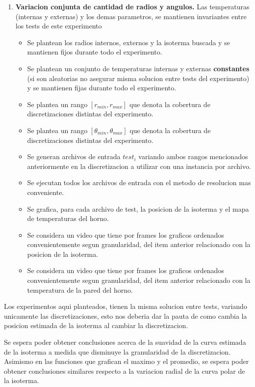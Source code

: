 \begin{enumerate}
    \item \textbf{Variacion conjunta de cantidad de radios y angulos.} Las temperaturas (internas y externas) y los demas parametros, se mantienen invariantes entre los tests de este experimento\begin{itemize}
        \item Se plantean los radios internos, externos y la isoterma buscada y se mantienen fijos durante todo el experimento.
        \item Se plantean un conjunto de temperaturas internas y externas \textbf{constantes} (si son aleatorias no asegurar misma solucion entre tests del experimento) y se mantienen fijas durante todo el experimento.
        \item Se plantea un rango $[r_{min}, r_{max}]$ que denota la cobertura de discretizaciones distintas del experimento.        
        \item Se plantea un rango $[\theta_{min}, \theta_{max}]$ que denota la cobertura de discretizaciones distintas del experimento.
        \item Se generan archivos de entrada $test_i$ variando ambos rangos mencionados anteriormente en la discretizacion a utilizar con una instancia por archivo.
        \item Se ejecutan todos los archivos de entrada con el metodo de resolucion mas conveniente.
        \item Se grafica, para cada archivo de test, la posicion de la isoterma y el mapa de temperaturas del horno.
        \item Se considera un video que tiene por frames los graficos ordenados convenientemente segun granularidad, del item anterior relacionado con la posicion de la isoterma.
        \item Se considera un video que tiene por frames los graficos ordenados convenientemente segun granularidad, del item anterior relacionado con la temperatura de la pared del horno.
    \end{itemize}    
\end{enumerate}

Los experimentos aqui planteados, tienen la misma solucion entre tests, variando unicamente las discretizaciones, esto nos deberia dar la pauta de como cambia la posicion estimada de la isoterma al cambiar la discretizacion.

Se espera poder obtener conclusiones acerca de la suavidad de la curva estimada de la isoterma a medida que disminuye la granularidad de la discretizacion. Asimismo en las funciones que grafican el maximo y el promedio, se espera poder obtener conclusiones similares respecto a la variacion radial de la curva polar de la isoterma.\\

